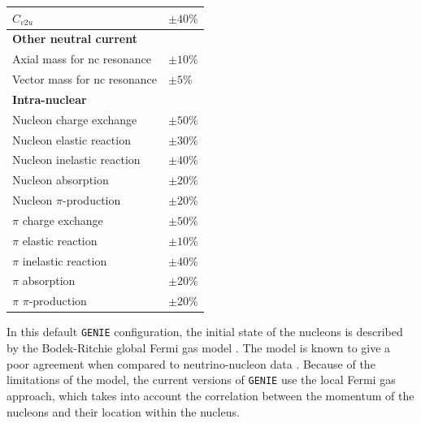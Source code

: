 \begin{table}[p!]
\begin{center}
\begin{small}
\begin{tabular}{l|l}
                $C_{v2u}$                                      & $\pm 40\%$                      \\[2mm] \hline
                \rule{0pt}{1.1\normalbaselineskip}\textbf{Other neutral current}                 &                                 \\[2mm]
                Axial mass for \gls{nc} resonance                    & $\pm 10\%$                      \\[2mm]
                Vector mass for \gls{nc} resonance                   & $\pm 5\%$                       \\[2mm] \hline
                \rule{0pt}{1.1\normalbaselineskip}\textbf{Intra-nuclear}                         &                                 \\[2mm]
                Nucleon charge exchange                        & $\pm 50\%$                      \\[2mm]
                Nucleon elastic reaction                       & $\pm 30\%$                      \\[2mm]
                Nucleon inelastic reaction                     & $\pm 40\%$                      \\[2mm]
                Nucleon absorption                             & $\pm 20\%$                      \\[2mm]
                Nucleon $\pi$-production                       & $\pm 20\%$                      \\[2mm]
                $\pi$ charge exchange                          & $\pm 50\%$                      \\[2mm]
                $\pi$ elastic reaction                         & $\pm 10\%$                      \\[2mm]
                $\pi$ inelastic reaction                       & $\pm 40\%$                      \\[2mm]
                $\pi$ absorption                               & $\pm 20\%$                      \\[2mm]
                $\pi$ $\pi$-production                         & $\pm 20\%$                     
            \end{tabular}
		\end{small}
	\end{center}
	\label{tab:xsec_genie_systs}
\end{table}

In this default \texttt{GENIE} configuration, the initial state of the nucleons is described by the Bodek-Ritchie global Fermi gas model \cite{Bodek1980}. The model is known to give a poor agreement when compared to neutrino-nucleon data \cite{Wilkinson2016}. Because of the limitations of the model, the current versions of \texttt{GENIE} use the local Fermi gas approach, which takes into account the correlation between the momentum of the nucleons and their location within the nucleus.

